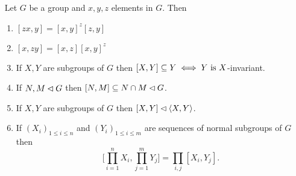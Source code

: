 \begin{prop}\label{commutator-props}${}$ Let\/ $G$ be a group and\/ $x,y,z$ elements in\/ $G$. Then
    \begin{enumerate}[\rm a)]
        \item $[zx,y] = [x,y]^z[z,y]$
        \item $[x,zy] = [x,z][x,y]^z$
        \item If\/ $X,Y$ are subgroups of\/ $G$ then\/ $[X,Y] \subseteq Y \iff Y \text{\rm\ is }X$-invariant.
        \item If\/ $N,M\lhd G$ then\/ $[N,M]\subseteq N\cap M\lhd G$.
        \item If\/ $X,Y$ are subgroups of\/ $G$ then\/ $[X,Y]\lhd\langle X,Y\rangle$.
        \item If\/ $(X_i)_{1\le i\le n}$ and\/ $(Y_i)_{1\le i\le m}$ are sequences of normal subgroups of\/ $G$ then
        $$
            \Big[\prod_{i=1}^nX_i,\prod_{j=1}^mY_j\Big]=\prod_{i,j}[X_i,Y_j].
        $$
    \end{enumerate}
\end{prop}

